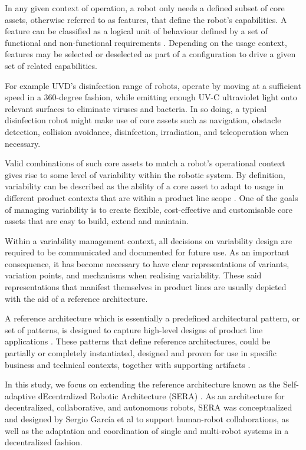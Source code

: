\documentclass[conference]{IEEEtran}
\begin{document}
In any given context of operation, a robot only needs a defined subset of core assets, otherwise referred to as features, that define the robot's capabilities. A feature can be classified as a logical unit of behaviour defined by a set of functional and non-functional requirements \cite{feats}. Depending on the usage context, features may be selected or deselected as part of a configuration to drive a given set of related capabilities. 

For example UVD's disinfection range of robots, operate by moving at a sufficient speed in a 360-degree fashion, while emitting enough UV-C ultraviolet light onto relevant surfaces to eliminate viruses and bacteria. In so doing, a typical disinfection robot might make use of core assets such as navigation, obstacle detection, collision avoidance, disinfection, irradiation, and teleoperation when necessary.

Valid combinations of such core assets to match a robot's operational context gives rise to some level of variability within the robotic system. By definition, variability can be described as the ability of a core asset to adapt to usage in different product contexts that are within a product line scope \cite{variab}. One of the goals of managing variability is to create flexible, cost-effective and customisable core assets that are easy to build, extend and maintain.

Within a variability management context, all decisions on variability design are required to be communicated and documented for future use. As an important consequence, it has become necessary to have clear representations of variants, variation points, and mechanisms when realising variability. These said representations that manifest themselves in product lines are usually depicted with the aid of a reference architecture.

A reference architecture which is essentially a predefined architectural pattern, or set of patterns, is designed to capture high-level designs of product line applications \cite{sple}. These patterns that define reference architectures, could be partially or completely instantiated, designed and proven for use in specific business and technical contexts, together with supporting artifacts \cite{ref-arch}.

In this study, we focus on extending the reference architecture known as the Self-adaptive dEcentralized Robotic Architecture (SERA) \cite{sera}. As an architecture for decentralized, collaborative, and autonomous robots, SERA was conceptualized and designed by Sergio Garc\'{i}a et al to support human-robot collaborations, as well as the adaptation and coordination of single and multi-robot systems in a decentralized fashion.
\end{document}
